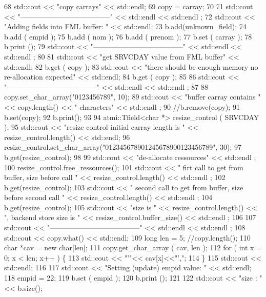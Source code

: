 \begin{DoxyCodeInclude}
68         std::cout << "copy carrays" << std::endl;
69         copy = carray;
70 
71         std::cout << "--------------------------------------" << std::endl << std::endl ;
72         std::cout << "Adding fields into FML buffer: " << std::endl;
73         b.add(unknown\_field);
74         b.add ( empid );
75         b.add ( nom );
76         b.add ( prenom );
77         b.set ( carray );
78         b.print ();
79         std::cout << "--------------------------------------" << std::endl << std::endl ;
80 
81         std::cout << "get SRVCDAY value from FML buffer" << std::endl;
82         b.get ( copy );
83         std::cout << "there should be enough memory no re-allocation expected" << std::endl;
84         b.get ( copy );
85 
86         std::cout << "--------------------------------------" << std::endl << std::endl ;
87 
88         copy.set\_char\_array("0123456789", 10);
89         std::cout << "buffer carray contains " << copy.length() << " characters" << std::endl ;
90         //b.remove(copy);
91         b.set(copy);
92         b.print();
93 
94         atmi::Tfield<char *> resize\_control ( SRVCDAY );
95         std::cout << "resize control initial carray length is  " << resize\_control.length() << std::endl;
96         resize\_control.set\_char\_array("012345678901245678900123456789", 30);
97         b.get(resize\_control);
98 
99         std::cout << "de-allocate ressources" << std::endl ;
100         resize\_control.free\_ressources();
101         std::cout << "  firt call to get from buffer, size before call " << resize\_control.length() <<
       std::endl ;
102         b.get(resize\_control);
103         std::cout << "  second call to get from buffer, size before second call " <<
       resize\_control.length() << std::endl ;
104         b.get(resize\_control);
105         std::cout << "size is " << resize\_control.length() << ", backend store size is " <<
       resize\_control.buffer\_size() << std::endl ;
106 
107         std::cout << "--------------------------------------" << std::endl << std::endl ;
108         std::cout << copy.what() << std::endl;
109         long len = 5;                  //copy.length();
110         char *cav = new char[len];
111         copy.get\_char\_array ( cav, len );
112         for ( int x = 0; x < len; x++ ) \{
113           std::cout << "'"<< cav[x]<<"',";
114         \}
115         std::cout << std::endl;
116 
117         std::cout << "Setting (update) empid value: " << std::endl;
118         empid = 22;
119         b.set ( empid );
120         b.print ();
121 
122         std::cout << "size : " << b.size();

\end{DoxyCodeInclude}
